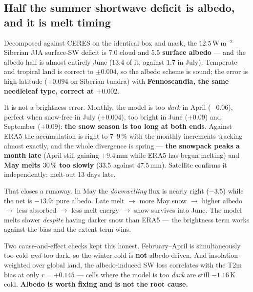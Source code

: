 \documentclass[10pt]{article}
\begin{document}
\subsection{Half the summer shortwave deficit is albedo, and it is melt timing}
Decomposed against CERES on the identical box and mask, the $12.5$\,W\,m$^{-2}$ Siberian JJA
surface-SW deficit is $7.0$ cloud and $\mathbf{5.5}$ \textbf{surface albedo} --- and the
albedo half is almost entirely June ($13.4$ of it, against $1.7$ in July). Temperate and
tropical land is correct to $\pm0.004$, so the albedo scheme is sound; the error is
high-latitude ($+0.094$ on Siberian tundra) with \textbf{Fennoscandia, the same needleleaf
type, correct at $+0.002$}.

It is not a brightness error. Monthly, the model is too \emph{dark} in April ($-0.06$),
perfect when snow-free in July ($+0.004$), too bright in June ($+0.09$) and September
($+0.09$): \textbf{the snow season is too long at both ends}. Against ERA5 the accumulation
is right to 7--9\,\% with the monthly increments tracking almost exactly, and the whole
divergence is spring --- \textbf{the snowpack peaks a month late} (April still gaining
$+9.4$\,mm while ERA5 has begun melting) and \textbf{May melts $30\,\%$ too slowly} ($33.5$
against $47.5$\,mm). Satellite confirms it independently: melt-out 13 days late.

That closes a runaway. In May the \emph{downwelling} flux is nearly right ($-3.5$) while the
net is $-13.9$: pure albedo. Late melt $\to$ more May snow $\to$ higher albedo $\to$ less
absorbed $\to$ less melt energy $\to$ snow survives into June. The model melts slower
\emph{despite} having darker snow than ERA5 --- the brightness term works against the bias
and the extent term wins.

Two cause-and-effect checks kept this honest. February--April is simultaneously too cold
\emph{and} too dark, so the winter cold is \textbf{not} albedo-driven. And insolation-weighted
over global land, the albedo-induced SW loss correlates with the T2m bias at only $r=+0.145$
--- cells where the model is too \emph{dark} are still $-1.16$\,K cold. \textbf{Albedo is
worth fixing and is not the root cause.}
\end{document}
